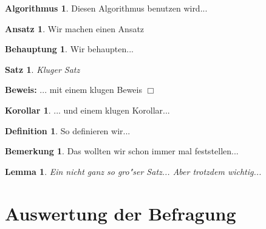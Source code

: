 \documentclass[10pt,a4paper, twoside]{article}
\theoremstyle{definition}
\newtheorem*{Algorithmus}{Algorithmus}
\newtheorem*{Ansatz}{Ansatz}
\newtheorem*{Behauptung}{Behauptung}
\newtheorem{Korollar}{Korollar}[subsection]
\newtheorem{Definition}{Definition}[subsection]
\newtheorem{Bemerkung}{Bemerkung}[subsection]
\newenvironment{Beweis}{\noindent\textbf{Beweis:}}{\hfill $\Box$ }
\theoremstyle{plain}
\newtheorem{Satz}{Satz}[subsection]
\newtheorem{Lemma}{Lemma}[subsection]
\numberwithin{equation}{subsection}
\begin{document}
\begin{Algorithmus}
Diesen Algorithmus benutzen wird...
\end{Algorithmus}
\begin{Ansatz}
Wir machen einen Ansatz
\end{Ansatz}

\begin{Behauptung}
Wir behaupten...
\end{Behauptung}

\begin{Satz}
Kluger Satz
\end{Satz}
\begin{Beweis}
... mit einem klugen Beweis
\end{Beweis}
\begin{Korollar}
... und einem klugen Korollar...
\end{Korollar}

\begin{Definition}
So definieren wir...
\end{Definition}
\begin{Bemerkung}
Das wollten wir schon immer mal feststellen...
\end{Bemerkung}
\begin{Lemma}
Ein nicht ganz so gro"ser Satz... Aber trotzdem wichtig...
\end{Lemma}


\pagebreak


\section*{Auswertung der Befragung}
\end{document}
